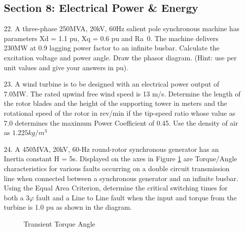 \documentclass[main.tex]{subfiles}
\begin{document}
\begin{enumerate}

\subsection*{Section 8: Electrical Power \& Energy}

\item[22.] A three-phase 250MVA, 20kV, 60Hz salient pole synchronous machine has parameters Xd = 1.1 pu, Xq = 0.6 pu and Ra~0. The machine delivers 230MW at 0.9 lagging power factor to an infinite busbar. Calculate the excitation voltage and power angle. Draw the phasor diagram. (Hint: use per unit values and give your answers in pu).

\item[23.] A wind turbine is to be designed with an electrical power output of 7.0MW. The rated upwind free wind speed is 13 m/s. Determine the length of the rotor blades and the height of the supporting tower in meters and the rotational speed of the rotor in rev/min if the tip-speed ratio whose value as 7.0 determines the maximum Power Coefficient of 0.45. Use the density of air as $\num{1.225}\unit{kg/m^3}$

\item[24.] A 450MVA, 20kV, 60-Hz round-rotor synchronous generator has an Inertia constant H = 5s. Displayed on the axes in Figure \ref{fig:24q_a} are Torque/Angle characteristics for various faults occurring on a double circuit transmission line when connected between a synchronous generator and an infinite busbar. Using the Equal Area Criterion, determine the critical switching times for both a $3 \varphi$ fault and a Line to Line fault when the input and torque from the turbine is 1.0 pu as shown in the diagram.

\begin{figure}
\centering{}
\caption{Transient Torque Angle}
\label{fig:24q_a}
\end{figure}

\end{enumerate}
\end{document}
